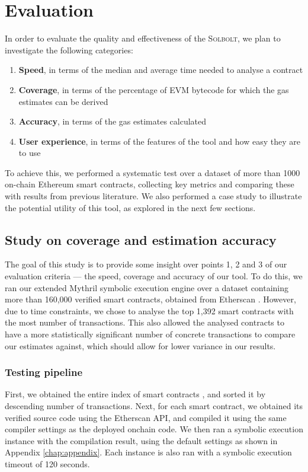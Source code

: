 \chapter{Evaluation}
\label{chap:eval}

In order to evaluate the quality and effectiveness of the \textcolor{NavyBlue}{\textsc{Solbolt}}, we plan 
to investigate the following categories:

\begin{enumerate}
  \item \textbf{Speed}, in terms of the median and average time needed to analyse a contract
  \item \textbf{Coverage}, in terms of the percentage of EVM bytecode for which the gas estimates can be derived
  \item \textbf{Accuracy}, in terms of the gas estimates calculated
  \item \textbf{User experience}, in terms of the features of the tool and how easy they are to use
\end{enumerate}

To achieve this, we performed a systematic test over a dataset of more than 1000 on-chain Ethereum
smart contracts, collecting key metrics and comparing these with results from previous literature. 
We also performed a case study to illustrate the potential utility of this tool, as explored 
in the next few sections.

\section{Study on coverage and estimation accuracy}

The goal of this study is to provide some insight over points 1, 2 and 3 of our evaluation
criteria --- the speed, coverage and accuracy of our tool. To do this, we ran our extended
Mythril symbolic execution engine
over a dataset containing more than 160,000 verified smart contracts, obtained from 
Etherscan \cite{smart_contract_sanctuary}. However, due to time constraints, we chose to
analyse the top 1,392 smart contracts with the most number of transactions. This also 
allowed the analysed contracts to have a more statistically significant number of concrete
transactions to compare our estimates against, which should allow for lower variance in our
results.

\subsection{Testing pipeline}
First, we obtained the entire index of smart contracts \cite{smart_contract_sanctuary}, 
and sorted it by descending number of transactions. Next, for each smart contract,
we obtained its verified source code using the Etherscan API, and compiled it using
the same compiler settings as the deployed onchain code. We then ran a symbolic execution
instance with the compilation result, using the default settings as shown in Appendix \ref{chap:appendix}.
Each instance is also ran with a symbolic execution timeout of 120 seconds.

